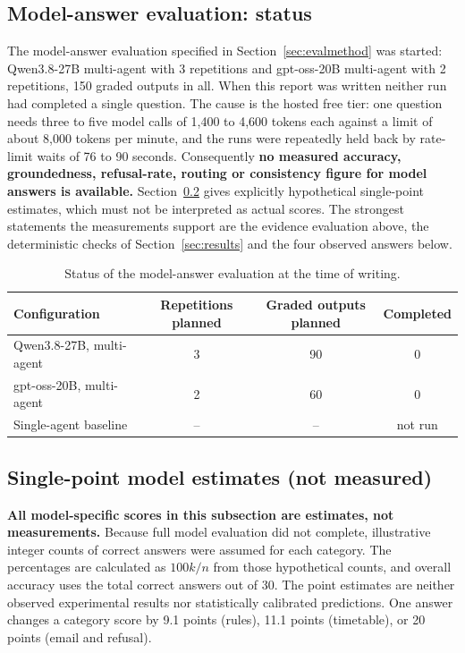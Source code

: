 \documentclass[10pt,a4paper]{article}
\begin{document}
\subsection{Model-answer evaluation: status}
The model-answer evaluation specified in Section~\ref{sec:evalmethod} was started: Qwen3.8-27B multi-agent with 3 repetitions and gpt-oss-20B multi-agent with 2 repetitions, 150 graded outputs in all. When this report was written neither run had completed a single question. The cause is the hosted free tier: one question needs three to five model calls of 1,400 to 4,600 tokens each against a limit of about 8,000 tokens per minute, and the runs were repeatedly held back by rate-limit waits of 76 to 90 seconds. Consequently \textbf{no measured accuracy, groundedness, refusal-rate, routing or consistency figure for model answers is available.} Section~\ref{sec:estimates} gives explicitly hypothetical single-point estimates, which must not be interpreted as actual scores. The strongest statements the measurements support are the evidence evaluation above, the deterministic checks of Section~\ref{sec:results} and the four observed answers below.

\begin{table}[H]
\centering\small
\caption{Status of the model-answer evaluation at the time of writing.}\label{tab:status}
\begin{tabular}{@{}lccc@{}}
\toprule
\textbf{Configuration} & \textbf{Repetitions planned} & \textbf{Graded outputs planned} & \textbf{Completed}\\
\midrule
Qwen3.8-27B, multi-agent & 3 & 90 & 0\\
gpt-oss-20B, multi-agent & 2 & 60 & 0\\
Single-agent baseline & -- & -- & not run\\
\bottomrule
\end{tabular}
\end{table}

\subsection{Single-point model estimates (not measured)}\label{sec:estimates}
\textbf{All model-specific scores in this subsection are estimates, not measurements.} Because full model evaluation did not complete, illustrative integer counts of correct answers were assumed for each category. The percentages are calculated as $100k/n$ from those hypothetical counts, and overall accuracy uses the total correct answers out of 30. The point estimates are neither observed experimental results nor statistically calibrated predictions. One answer changes a category score by 9.1 points (rules), 11.1 points (timetable), or 20 points (email and refusal).
\end{document}
